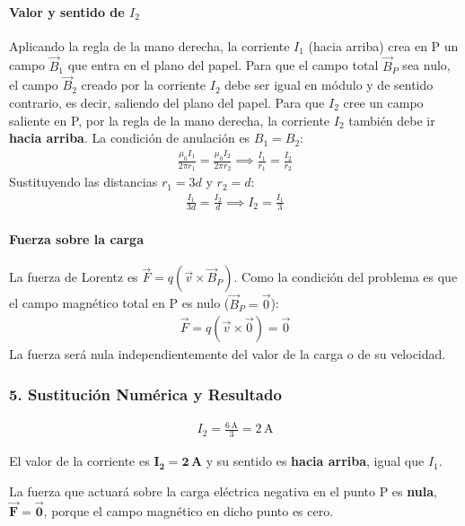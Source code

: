 \paragraph*{Valor y sentido de $I_2$}
Aplicando la regla de la mano derecha, la corriente $I_1$ (hacia arriba) crea en P un campo $\vec{B}_1$ que entra en el plano del papel. Para que el campo total $\vec{B}_P$ sea nulo, el campo $\vec{B}_2$ creado por la corriente $I_2$ debe ser igual en módulo y de sentido contrario, es decir, saliendo del plano del papel. Para que $I_2$ cree un campo saliente en P, por la regla de la mano derecha, la corriente $I_2$ también debe ir \textbf{hacia arriba}.
\smallskip
La condición de anulación es $B_1 = B_2$:
\begin{gather}
    \frac{\mu_0 I_1}{2\pi r_1} = \frac{\mu_0 I_2}{2\pi r_2} \implies \frac{I_1}{r_1} = \frac{I_2}{r_2}
\end{gather}
Sustituyendo las distancias $r_1=3d$ y $r_2=d$:
\begin{gather}
    \frac{I_1}{3d} = \frac{I_2}{d} \implies I_2 = \frac{I_1}{3}
\end{gather}
\paragraph*{Fuerza sobre la carga}
La fuerza de Lorentz es $\vec{F} = q(\vec{v} \times \vec{B}_P)$. Como la condición del problema es que el campo magnético total en P es nulo ($\vec{B}_P = \vec{0}$):
\begin{gather}
    \vec{F} = q(\vec{v} \times \vec{0}) = \vec{0}
\end{gather}
La fuerza será nula independientemente del valor de la carga o de su velocidad.

\subsubsection*{5. Sustitución Numérica y Resultado}
\begin{gather}
    I_2 = \frac{6 \, \text{A}}{3} = 2 \, \text{A}
\end{gather}
\begin{cajaresultado}
    El valor de la corriente es $\boldsymbol{I_2 = 2 \, \textbf{A}}$ y su sentido es \textbf{hacia arriba}, igual que $I_1$.
\end{cajaresultado}
\medskip
\begin{cajaresultado}
    La fuerza que actuará sobre la carga eléctrica negativa en el punto P es \textbf{nula}, $\boldsymbol{\vec{F} = \vec{0}}$, porque el campo magnético en dicho punto es cero.
\end{cajaresultado}

